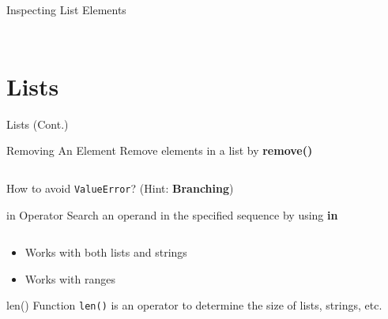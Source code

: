         \begin{frame}{Inspecting List Elements}
            \LARGE
            \inputminted[frame=single,framesep=2pt]{python3}{../Lecture3/code-examples/slicing3.py}
            \inputminted[frame=single,framesep=2pt]{python3}{../Lecture3/code-examples/slicing4.py}
        \end{frame}

    \section{Lists}
        \begin{frame}{Lists (Cont.)}
        
            
        
        \end{frame}

        \begin{frame}{Removing An Element}
            \pause
            \LARGE
            Remove elements in a list by \textbf{remove()}
            \pause              
            \bigskip
            \normalsize
            \inputminted[frame=single,framesep=2pt]{python3}{../Lecture3/code-examples/remove.py}
            \pause
            \LARGE
            How to avoid \texttt{ValueError}? \pause (Hint: \textbf{Branching})
        \end{frame}

        \begin{frame}{in Operator}
            \pause
            \LARGE
            Search an operand in the specified sequence by using \textbf{in}
            \pause
            \bigskip
            \inputminted[frame=single,framesep=2pt]{python3}{../Lecture3/code-examples/in_operator.py}
            \pause
            \begin{itemize}
                \item Works with both lists and strings
                \pause
                \item Works with ranges
            \end{itemize}
        \end{frame}

        \begin{frame}{len() Function}
            \pause
            \LARGE
            \texttt{len()} is an operator to determine the size of lists, strings, etc.
            \pause
            \bigskip
            \inputminted[frame=single,framesep=2pt]{python3}{../Lecture3/code-examples/length.py}
        \end{frame}

